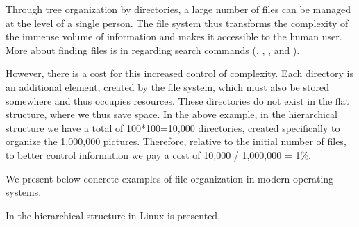 Through tree organization by directories, a large number of files can be managed at the level of a single person.
The file system thus transforms the complexity of the immense volume of information and makes it accessible to the human user.
More about finding files is in  regarding search commands (, , ,  and ).

However, there is a cost for this increased control of complexity.
Each directory is an additional element, created by the file system, which must also be stored somewhere and thus occupies resources.
These directories do not exist in the flat structure, where we thus save space.
In the above example, in the hierarchical structure we have a total of 100*100=10,000 directories, created specifically to organize the 1,000,000 pictures.
Therefore, relative to the initial number of files, to better control information we pay a cost of 10,000 / 1,000,000 = 1\%.

We present below concrete examples of file organization in modern operating systems.

In  the hierarchical structure in Linux is presented.

